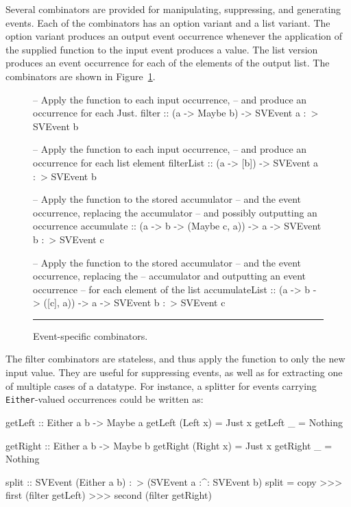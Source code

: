 \documentclass[draft]{llncs}
\begin{document}
Several combinators are provided for manipulating, suppressing, and generating events.
Each of the combinators has an option variant and a list variant. The option variant
produces an output event occurrence whenever the application of the supplied function
to the input event produces a value. The list version produces an event occurrence for
each of the elements of the output list. The combinators are shown in Figure~\ref{figure:event_specific_combinators}.

\begin{figure}
\begin{code}
-- Apply the function to each input occurrence,
-- and produce an occurrence for each Just.
filter :: (a -> Maybe b) -> SVEvent a :~> SVEvent b

-- Apply the function to each input occurrence,
-- and produce an occurrence for each list element
filterList :: (a -> [b]) -> SVEvent a :~> SVEvent b

-- Apply the function to the stored accumulator
-- and the event occurrence, replacing the accumulator
-- and possibly outputting an occurrence
accumulate ::    (a -> b -> (Maybe c, a))
              -> a
              -> SVEvent b :~> SVEvent c

-- Apply the function to the stored accumulator
-- and the event occurrence, replacing the
-- accumulator and outputting an event occurrence
-- for each element of the list
accumulateList ::    (a -> b -> ([c], a))
                  -> a
                  -> SVEvent b :~> SVEvent c
\end{code}
\hrule
\caption{Event-specific combinators.}
\label{figure:event_specific_combinators}
\end{figure}

The filter combinators are stateless, and thus apply the function to only the new
input value. They are useful for suppressing events, as well as for extracting one
of multiple cases of a datatype. For instance, a splitter for events carrying
{\tt Either}-valued occurrences could be written as:

\begin{code}
getLeft :: Either a b -> Maybe a
getLeft (Left x) = Just x
getLeft _ = Nothing

getRight :: Either a b -> Maybe b
getRight (Right x) = Just x
getRight _ = Nothing

split :: SVEvent (Either a b) :~> (SVEvent a :^: SVEvent b)
split = copy >>> first (filter getLeft) >>> second (filter getRight)
\end{code}
\end{document}
